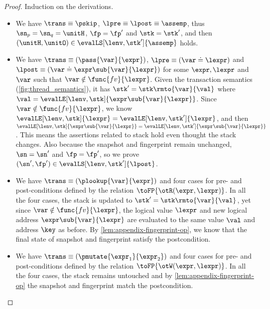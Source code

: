 \begin{proof}
Induction on the derivations.

\begin{itemize}

\item {}
We have \(\trans \equiv \pskip\), \( \lpre \equiv \lpost \equiv \assemp \), thus \( \sn_{p} = \sn_{q} = \unitH \), \( \fp = \fp' \) and \( \stk = \stk' \), and then \( (\unitH,\unitO ) \in \evalLS[\lenv, \stk']{\assemp} \) holds.

\item {}
We have \(\trans \equiv ( \pass{\var}{\expr} ) \), \( \lpre \equiv ( \var \doteq \lexpr ) \) and \( \lpost \equiv ( \var \doteq \expr\sub{\var}{\lexpr} ) \) 
for some \( \expr, \lexpr \) and \( \var \) such that \( \var \notin \func{fv}{\lexpr}\).
Given the transaction semantics (\cref{fig:thread_semantics}), it has \( \stk' = \stk\rmto{\var}{\val} \) where \( \val = \evalLE[\lenv, \stk]{\expr\sub{\var}{\lexpr}} \).
Since \( \var \notin \func{fv}{\lexpr} \), we know \( \evalLE[\lenv, \stk]{\lexpr} = \evalLE[\lenv, \stk']{\lexpr} \), and then \( \evalLE[\lenv, \stk]{\expr\sub{\var}{\lexpr}} = \evalLE[\lenv, \stk']{\expr\sub{\var}{\lexpr}} \).
This means the assertions related to stack hold even thought the stack changes.
Also because the snapshot and fingerprint remain unchanged, \ie \( \sn = \sn' \) and \( \fp = \fp' \), so we prove \( (\sn', \fp' ) \in \evalLS[\lenv, \stk']{\lpost} \).

\item {}
We have \(\trans \equiv ( \plookup{\var}{\expr} ) \) and four cases for pre- and post-conditions defined by the relation \( \toFP{\otR(\expr, \lexpr)}\).
In all the four cases, the stack is updated to \( \stk' = \stk\rmto{\var}{\val} \), yet since \( \var \notin \func{fv}{\lexpr}\), the logical value \( \lexpr \) and new logical address \( \expr\sub{\var}{\lexpr}\) are evaluated to the same value \( \val \) and address \( \key \) as before.
By \cref{lem:appendix-fingerprint-op}, we know that the final state of snapshot and fingerprint satisfy the postcondition.

\item {}
We have  \( \trans \equiv (\pmutate{\expr_{1}}{\expr_{2}}) \) and four cases for pre- and post-conditions defined by the relation \( \toFP{\otW(\expr, \lexpr)}\). 
In all the four cases, the stack remains untouched and  by \cref{lem:appendix-fingerprint-op} the snapshot and fingerprint match the postcondition.


\end{itemize}
\end{proof}
